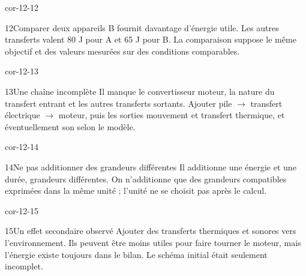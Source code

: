 \documentclass[12pt,twoside,openany]{book}
\begin{document}
\begin{blocLivre}{cor-12-12}
\begin{corrige}{12}{Comparer deux appareils}
B fournit davantage d’énergie utile. Les autres transferts valent 80 J pour A et 65 J pour B. La comparaison suppose le même objectif et des valeurs mesurées sur des conditions comparables.\par
\end{corrige}\end{blocLivre}
\begin{blocLivre}{cor-12-13}
\begin{corrige}{13}{Une chaîne incomplète}
Il manque le convertisseur moteur, la nature du transfert entrant et les autres transferts sortants. Ajouter pile \(\rightarrow\) transfert électrique \(\rightarrow\) moteur, puis les sorties mouvement et transfert thermique, et éventuellement son selon le modèle.\par
{}
\end{corrige}\end{blocLivre}
\begin{blocLivre}{cor-12-14}
\begin{corrige}{14}{Ne pas additionner des grandeurs différentes}
Il additionne une énergie et une durée, grandeurs différentes. On n’additionne que des grandeurs compatibles exprimées dans la même unité ; l’unité ne se choisit pas après le calcul.\par
\end{corrige}\end{blocLivre}
\begin{blocLivre}{cor-12-15}
\begin{corrige}{15}{Un effet secondaire observé}
Ajouter des transferts thermiques et sonores vers l’environnement. Ils peuvent être moins utiles pour faire tourner le moteur, mais l’énergie existe toujours dans le bilan. Le schéma initial était seulement incomplet.\par
\end{corrige}\end{blocLivre}
\label{solutions-12}
\end{document}
